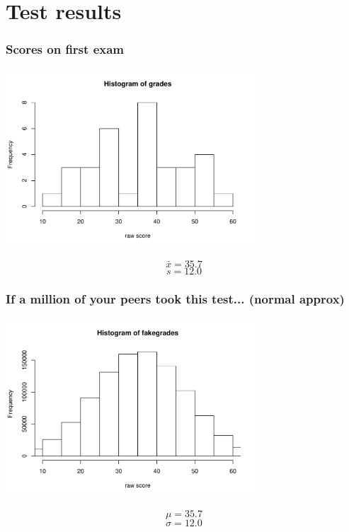 \section{Test results}

\begin{frame}
\begin{center}
\frametitle{Scores on first exam}
\includegraphics[width=0.7\textwidth]{3-1_normal_distribution/figures/grades/grades.pdf}
\end{center}
$$\bar{x} = 35.7$$
$$s=12.0$$
\end{frame}



\begin{frame}
\begin{center}
\frametitle{If a million of your peers took this test... (normal approx)}
\includegraphics[width=0.7\textwidth]{3-1_normal_distribution/figures/grades/fakegrades.pdf}
\end{center}
$$\mu = 35.7$$
$$\sigma=12.0$$
\end{frame}

